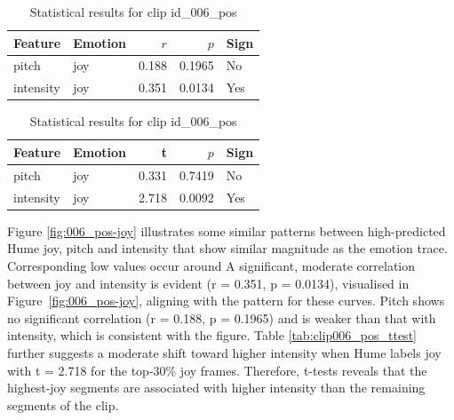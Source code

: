 \begin{table}[ht]
    \centering
    \begin{subtable}[t]{0.48\textwidth}
      \centering
      \caption{Pearson Correlation (Clip id\_006\_pos)}
      \label{tab:clip006_pos_pearson}
      \begin{tabular}{llrrl}
        \toprule
        Feature            & Emotion &  $r$ & $p$ & Sign \\
        \midrule
        pitch\     & joy     &  0.188        & 0.1965    & No  \\
        intensity & joy     &  0.351        & 0.0134    & Yes \\
        \bottomrule
      \end{tabular}
    \end{subtable}
    \hfill
    \begin{subtable}[t]{0.48\textwidth}
      \centering
      \caption{t-test (Clip id\_006\_pos)}
      \label{tab:clip006_pos_ttest}
      \begin{tabular}{llrrl}
        \toprule
        Feature            & Emotion & t & $p$ & Sign \\
        \midrule
        pitch     & joy     &  0.331       & 0.7419    & No  \\
        intensity & joy     &  2.718       & 0.0092    & Yes \\
        \bottomrule
      \end{tabular}
    \end{subtable}
    \caption{Statistical results for clip id\_006\_pos}
    \label{tab:clip006_pos_stats}
  \end{table}
  

  Figure \ref{fig:006_pos-joy} illustrates some similar patterns between high-predicted Hume joy, pitch and intensity that show similar magnitude as the emotion trace. 
  Corresponding low values occur around %
  A significant, moderate correlation between joy and intensity is evident (r = 0.351, p = 0.0134), visualised in Figure~\ref{fig:006_pos-joy}, aligning with the pattern for these curves. 
  Pitch shows no significant correlation (r = 0.188, p = 0.1965) and is weaker than that with intensity, which is consistent with the figure.
  Table \ref{tab:clip006_pos_ttest} further suggests a moderate shift toward higher intensity when Hume labels joy with t = 2.718 for the top-30\% joy frames. Therefore, t-tests reveals that the highest-joy segments are associated with higher intensity than the remaining segments of the clip.


